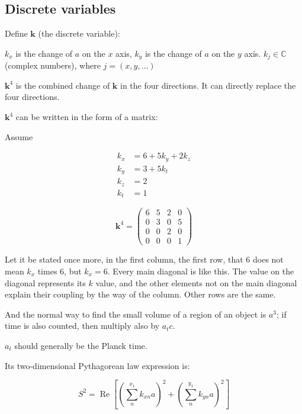 \documentclass[UTF8]{article}
\begin{document}
\subsection{Discrete variables}

Define \(\mathbf{k}\) (the discrete variable):

\(k_x\) is the change of \(a\) on the \(x\) axis, \(k_y\) is the change of \(a\) on the \(y\) axis. \(k_j\in\mathbb{C}\) (complex numbers), where \(j=(x,y,\dots)\)

\(\mathbf{k}^4\) is the combined change of \(\mathbf{k}\) in the four directions. It can directly replace the four directions.

\(\mathbf{k}^4\) can be written in the form of a matrix:

Assume

\begin{align*}
k_x &= 6+5k_y+2k_z\\
k_y &= 3+5k_t\\
k_z &= 2\\
k_t &= 1
\end{align*}

\begin{equation}
\mathbf{k}^4=
\begin{pmatrix}
6 & 5 & 2 & 0\\
0 & 3 & 0 & 5\\
0 & 0 & 2 & 0\\
0 & 0 & 0 & 1
\end{pmatrix}
\end{equation}

Let it be stated once more, in the first column, the first row, that \(6\) does not mean \(k_x\) times \(6\), but \(k_x=6\). Every main diagonal is like this. The value on the diagonal represents its \(k\) value, and the other elements not on the main diagonal explain their coupling by the way of the column. Other rows are the same.

And the normal way to find the small volume of a region of an object is \(a^3\); if time is also counted, then multiply also by \(a_tc\).

\(a_t\) should generally be the Planck time.

Its two-dimensional Pythagorean law expression is:

\begin{equation}
S^2=\operatorname{Re}\left[\left(\sum_{n}^{x_1}k_{xn}a\right)^2+\left(\sum_{n}^{y_1}k_{yn}a\right)^2\right]
\end{equation}
\end{document}
